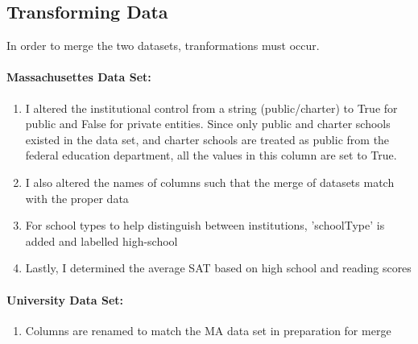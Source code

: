 \documentclass[11pt]{article}
\providecommand{\tightlist}{%
      \setlength{\itemsep}{0pt}\setlength{\parskip}{0pt}}
\begin{document}
    \subsection{Transforming Data}\label{transforming-data}

In order to merge the two datasets, tranformations must occur.

\paragraph{Massachusettes Data Set:}\label{massachusettes-data-set}

\begin{enumerate}
\def\labelenumi{\arabic{enumi}.}
\tightlist
\item
  I altered the institutional control from a string (public/charter) to
  True for public and False for private entities. Since only public and
  charter schools existed in the data set, and charter schools are
  treated as public from the federal education department, all the
  values in this column are set to True.
\item
  I also altered the names of columns such that the merge of datasets
  match with the proper data
\item
  For school types to help distinguish between institutions,
  'schoolType' is added and labelled high-school
\item
  Lastly, I determined the average SAT based on high school and reading
  scores
\end{enumerate}

\paragraph{University Data Set:}\label{university-data-set}

\begin{enumerate}
\def\labelenumi{\arabic{enumi}.}
\tightlist
\item
  Columns are renamed to match the MA data set in preparation for merge
\end{enumerate}
\end{document}
